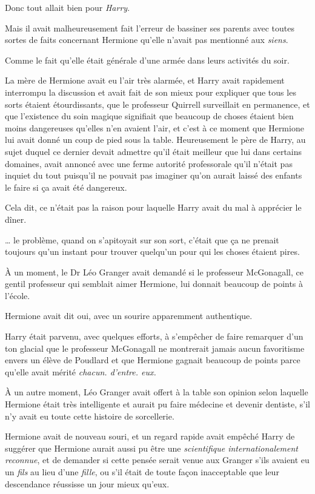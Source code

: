 Donc tout allait bien pour \emph{Harry}.

Mais il avait malheureusement fait l'erreur de bassiner ses parents avec toutes sortes de faits concernant Hermione qu'elle n'avait pas mentionné aux \emph{siens}.

Comme le fait qu'elle était générale d'une armée dans leurs activités du soir.

La mère de Hermione avait eu l'air très alarmée, et Harry avait rapidement interrompu la discussion et avait fait de son mieux pour expliquer que tous les sorts étaient étourdissants, que le professeur Quirrell surveillait en permanence, et que l'existence du soin magique signifiait que beaucoup de choses étaient bien moins dangereuses qu'elles n'en avaient l'air, et c'est à ce moment que Hermione lui avait donné un coup de pied sous la table. Heureusement le père de Harry, au sujet duquel ce dernier devait admettre qu'il était meilleur que lui dans certains domaines, avait annoncé avec une ferme autorité professorale qu'il n'était pas inquiet du tout puisqu'il ne pouvait pas imaginer qu'on aurait laissé des enfants le faire si ça avait été dangereux.

Cela dit, ce n'était pas la raison pour laquelle Harry avait du mal à apprécier le dîner.

… le problème, quand on s'apitoyait sur son sort, c'était que ça ne prenait toujours qu'un instant pour trouver quelqu'un pour qui les choses étaient pires.

À un moment, le Dr Léo Granger avait demandé si le professeur McGonagall, ce gentil professeur qui semblait aimer Hermione, lui donnait beaucoup de points à l'école.

Hermione avait dit oui, avec un sourire apparemment authentique.

Harry était parvenu, avec quelques efforts, à s'empêcher de faire remarquer d'un ton glacial que le professeur McGonagall ne montrerait jamais aucun favoritisme envers un élève de Poudlard et que Hermione gagnait beaucoup de points parce qu'elle avait mérité \emph{chacun. d'entre. eux.}

À un autre moment, Léo Granger avait offert à la table son opinion selon laquelle Hermione était très intelligente et aurait pu faire médecine et devenir dentiste, s'il n'y avait eu toute cette histoire de sorcellerie.

Hermione avait de nouveau souri, et un regard rapide avait empêché Harry de suggérer que Hermione aurait aussi pu être une \emph{scientifique internationalement reconnue}, et de demander si cette pensée serait venue aux Granger s'ils avaient eu un \emph{fils} au lieu d'une \emph{fille}, ou s'il était de toute façon inacceptable que leur descendance réussisse un jour mieux qu'eux.

